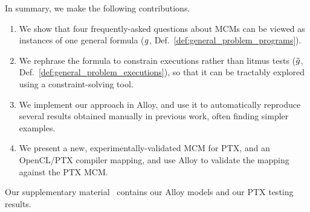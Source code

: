 

\medskip\noindent In summary, we make the following contributions.
%
\begin{enumerate}

\item We show that four frequently-asked questions about MCMs can be
viewed as instances of one general formula ($g$,
Def.~\ref{def:general_problem_programs}).

\item We rephrase the formula to constrain executions rather than
litmus tests ($\tilde{g}$,
Def.~\ref{def:general_problem_executions}), so that it can be
tractably explored using a constraint-solving tool.

\item We implement our approach in Alloy, and use it to automatically
reproduce several results obtained manually in previous work, often
finding simpler examples.

\item We present a new, experimentally-validated MCM for PTX, and an
OpenCL/PTX compiler mapping, and use Alloy to validate the mapping
against the PTX MCM.


\end{enumerate}

Our supplementary material~\cite{popl17supplementary} contains our
Alloy models and our PTX testing results.

